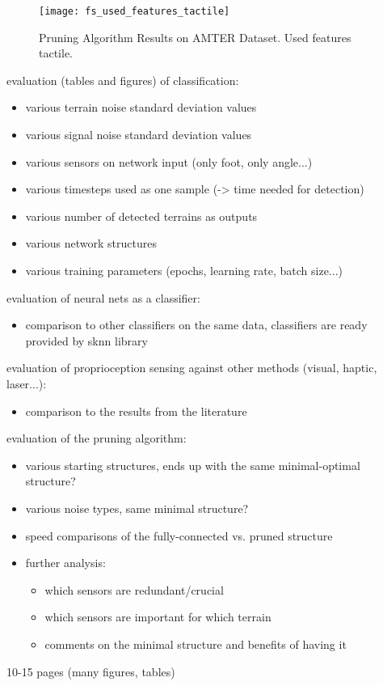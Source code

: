 \begin{figure}[H]
  \centering
  \texttt{[image: fs\_used\_features\_tactile]}
  \caption{Pruning Algorithm Results on AMTER Dataset. Used features tactile.}
  \label{fig:pa_amter_used_features_tactile}
\end{figure}

evaluation (tables and figures) of classification:
\begin{itemize}
\item various terrain noise standard deviation values
\item various signal noise standard deviation values
\item various sensors on network input (only foot, only angle...)
\item various timesteps used as one sample (-> time needed for detection)
\item various number of detected terrains as outputs
\item various network structures
\item various training parameters (epochs, learning rate, batch size...)
\end{itemize}


evaluation of neural nets as a classifier:
\begin{itemize}
\item comparison to other classifiers on the same data, classifiers are ready provided by sknn library
\end{itemize}

evaluation of proprioception sensing against other methods (visual, haptic, laser...):
\begin{itemize}
\item comparison to the results from the literature
\end{itemize}

evaluation of the pruning algorithm:
\begin{itemize}
\item various starting structures, ends up with the same minimal-optimal structure?
\item various noise types, same minimal structure?
\item speed comparisons of the fully-connected vs. pruned structure
\item further analysis:
 \begin{itemize}
 \item which sensors are redundant/crucial
 \item which sensors are important for which terrain
 \item comments on the minimal structure and benefits of having it
 \end{itemize}
\end{itemize}
10-15 pages (many figures, tables)
